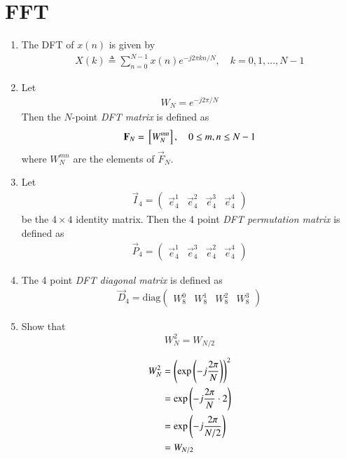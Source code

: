\documentclass[journal,12pt,twocolumn]{IEEEtran}
\newcommand{\myvec}[1]{\ensuremath{\begin{pmatrix}#1\end{pmatrix}}}
\renewcommand\thesection{\arabic{section}}
\begin{document}
\section{FFT}
\begin{enumerate}[label=\thesection.\arabic*]
\item The DFT of $x(n)$ is given by
\begin{align}
	X(k) \triangleq \sum_{n=0}^{N-1} x(n) e^{-j 2 \pi k n / N}, \quad k=0,1, \ldots, N-1
\end{align}

\item Let 
\begin{align}
	W_{N} = e^{-j2\pi/N} 
\end{align}
	Then the $N$-point {\em DFT matrix} is defined as 
\begin{align}
	\mathbf{F}_{N} = {}\left[W_{N}^{mn}\right], \quad 0 \le m,n \le N-1 
\end{align}
where $W_{N}^{mn}$ are the elements of $\vec{F}_{N}$.

\item Let 
\begin{align}
	\vec{I}_4 = \myvec{\vec{e}_4^{1} &\vec{e}_4^{2} &\vec{e}_4^{3} &\vec{e}_4^{4} }
\end{align}
	be the $4\times 4$ identity matrix.  Then the 4 point {\em DFT permutation matrix} is defined as 
\begin{align}
	\vec{P}_4 = \myvec{\vec{e}_4^{1} &\vec{e}_4^{3} &\vec{e}_4^{2} &\vec{e}_4^{4} }
\end{align}

\item The 4 point {\em DFT diagonal matrix} is defined as 
\begin{align}
	\vec{D}_4 = \mathrm{diag}\myvec{W_{8}^{0} & W_{8}^{1} & W_{8}^{2} & W_{8}^{3}}
\end{align}

\item Show that 
\begin{equation}
		W_{N}^{2}=W_{N/2}
\end{equation}

\solution
\begin{align}
	W_N^2 &= \left(\exp\left(-j\frac{2\pi}{N}\right)\right)^2	 \\
	&= \exp\left(-j\frac{2\pi}{N} \cdot 2\right) \\
	&= \exp\left(-j\frac{2\pi}{N/2}\right) \\
	&= W_{N/2}
\end{align}	 


\end{enumerate}
\end{document}
